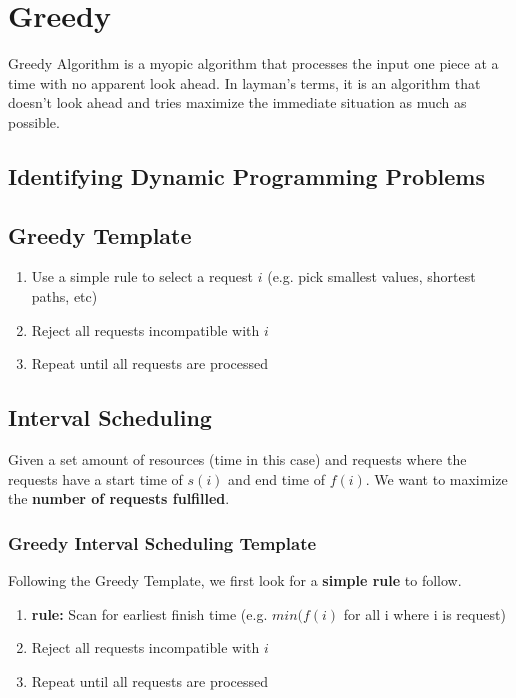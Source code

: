 \documentclass{article}
\begin{document}
\section{Greedy}

Greedy Algorithm is a myopic algorithm that processes the input one piece at a time with no apparent look ahead. In layman's terms, it is an algorithm that doesn't look ahead and tries maximize the immediate situation as much as possible. 

\subsection{Identifying Dynamic Programming Problems}

\subsection{Greedy Template}

\begin{enumerate}
	\item Use a simple rule to select a request \(i\) (e.g. pick smallest values, shortest paths, etc)
	\item Reject all requests incompatible with \(i\)
	\item Repeat until all requests are processed
\end{enumerate}

\subsection{Interval Scheduling}

Given a set amount of resources (time in this case) and requests where the requests have a start time of \(s(i)\) and end time of \(f(i)\). We want to maximize the \textbf{number of requests fulfilled}.

\subsubsection{Greedy Interval Scheduling Template}

Following the Greedy Template, we first look for a \textbf{simple rule} to follow. 

\begin{enumerate}
	\item \textbf{rule:} Scan for earliest finish time (e.g. \(min(f(i)\) for all i where i is request)
	\item Reject all requests incompatible with \(i\)
	\item Repeat until all requests are processed
\end{enumerate}
\end{document}
